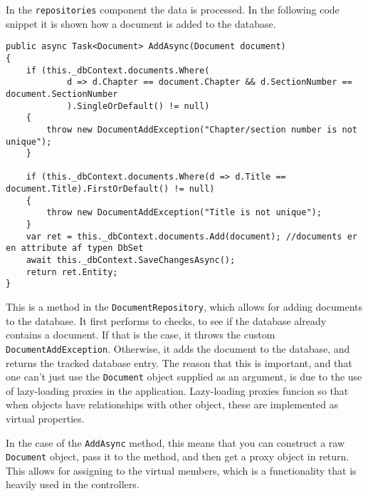 In the \texttt{repositories} component the data is processed.
In the following code snippet it is shown how a document is added to the database.
\\
\begin{lstlisting}[caption={Document repository: AddAsync}, label={lst:docrepadd}]
public async Task<Document> AddAsync(Document document)
{
	if (this._dbContext.documents.Where(
			d => d.Chapter == document.Chapter && d.SectionNumber == document.SectionNumber
			).SingleOrDefault() != null)
	{
		throw new DocumentAddException("Chapter/section number is not unique");
	}

	if (this._dbContext.documents.Where(d => d.Title == document.Title).FirstOrDefault() != null)
	{
		throw new DocumentAddException("Title is not unique");
	}
	var ret = this._dbContext.documents.Add(document); //documents er en attribute af typen DbSet
	await this._dbContext.SaveChangesAsync();
	return ret.Entity;
}
\end{lstlisting}
This is a method in the \texttt{DocumentRepository}, which allows for adding documents to the database.
It first performs to checks, to see if the database already contains a document.
If that is the case, it throws the custom \texttt{DocumentAddException}.
Otherwise, it adds the document to the database, and returns the tracked database entry.
The reason that this is important, and that one can't just use the \texttt{Document} object supplied as an argument, is due to the use of lazy-loading proxies in the application.
Lazy-loading proxies funcion so that when objects have relationships with other object, these are implemented as virtual properties.


In the case of the \texttt{AddAsync} method, this means that you can construct a raw \texttt{Document} object, pass it to the method, and then get a proxy object in return.
This allows for assigning to the virtual members, which is a functionality that is heavily used in the controllers.

